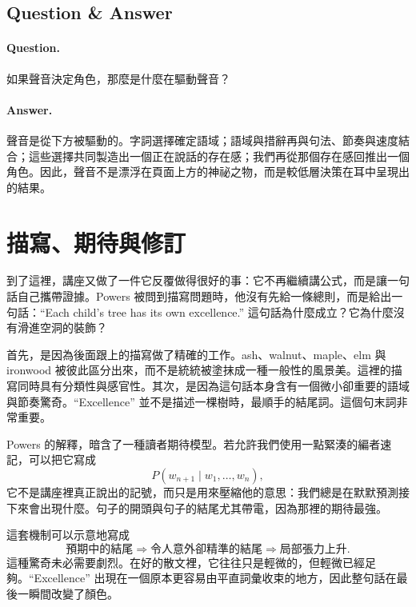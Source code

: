 \subsection{Question \& Answer}

\paragraph{Question.} 如果聲音決定角色，那麼是什麼在驅動聲音？

\paragraph{Answer.} 聲音是從下方被驅動的。字詞選擇確定語域；語域與措辭再與句法、節奏與速度結合；這些選擇共同製造出一個正在說話的存在感；我們再從那個存在感回推出一個角色。因此，聲音不是漂浮在頁面上方的神祕之物，而是較低層決策在耳中呈現出的結果。

\section{描寫、期待與修訂}

到了這裡，講座又做了一件它反覆做得很好的事：它不再繼續講公式，而是讓一句話自己攜帶證據。Powers 被問到描寫問題時，他沒有先給一條總則，而是給出一句話：``Each child's tree has its own excellence.'' 這句話為什麼成立？它為什麼沒有滑進空洞的裝飾？

首先，是因為後面跟上的描寫做了精確的工作。ash、walnut、maple、elm 與 ironwood 被彼此區分出來，而不是統統被塗抹成一種一般性的風景美。這裡的描寫同時具有分類性與感官性。其次，是因為這句話本身含有一個微小卻重要的語域與節奏驚奇。``Excellence'' 並不是描述一棵樹時，最順手的結尾詞。這個句末詞非常重要。

Powers 的解釋，暗含了一種讀者期待模型。若允許我們使用一點緊湊的編者速記，可以把它寫成
\begin{equation}
P(w_{n+1}\mid w_1,\dots,w_n),
\end{equation}
它不是講座裡真正說出的記號，而只是用來壓縮他的意思：我們總是在默默預測接下來會出現什麼。句子的開頭與句子的結尾尤其帶電，因為那裡的期待最強。

這套機制可以示意地寫成
\begin{equation}
\text{預期中的結尾} \Rightarrow \text{令人意外卻精準的結尾} \Rightarrow \text{局部張力上升}.
\end{equation}
這種驚奇未必需要劇烈。在好的散文裡，它往往只是輕微的，但輕微已經足夠。``Excellence'' 出現在一個原本更容易由平直詞彙收束的地方，因此整句話在最後一瞬間改變了顏色。

